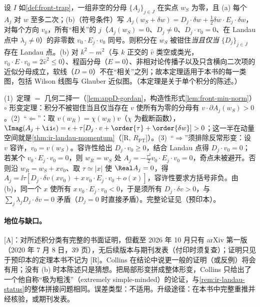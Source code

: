\begin{theorem}\label{thm:front-collins-pinch}
设 $I$ 如\cref{def:front-trap}，一组非空的分母 $\{A_j\}_{j\in J}$ 在实点 $w_S$ 为零，且 (a) 每个 $A_j$ 对 $w$ 至多二次；(b)（符号条件）写 $A_j(w_S+\delta w)=D_j\cdot\delta w+\frac12\delta w\cdot E_j\cdot\delta w$，对每个方向 $v_0$，所有“相关”的 $j$（$A_j(w_S)=0$、$D_j\ne0$、$D_j\cdot v_0=0$、在 Landau 点中 $\lambda_j\ne0$）的非零数 $v_0\cdot E_j\cdot v_0$ 同号。则积分在 $w_S$ 被钳住\emph{当且仅当} $\{D_j\}_{j\in J}$ 存在 Landau 点。(b) 对 $k^2-m^2$（与 $k$ 正交的 $\hat v$ 类空或类光，$v_0\cdot E\cdot v_0=2\hat v^2\le0$）、程函分母（$E=0$）、非相对论传播子以及只含横向二次项的近似分母成立，软线（$D=0$）不在“相关”之列；故本定理适用于本书的每一类图，包括 Wilson 线图与 Glauber 近似图。（本定理是关于单个积分的陈述。）
\end{theorem}

\begin{proofsketch}
(1)~定理 $=$ 几何二择一（\cref{lem:appD-gordan}，构造性形式\cref{lem:front-min-norm}）$\circ$ 形变定理：积分不被钳住当且仅当存在 $v$ 使所有为零的分母有 $v\cdot\partial A_j(w_S)>0$\cite[定理~2]{Collins:2020euz}。(2)~“$\Leftarrow$”：取 $v(w_R)=\chi(w_R)v$（$\chi$ 为截断函数），$\Imag(A_j+\ii\epsilon)=\epsilon+\tau[D_j\cdot v+\order{\tau}+\order{\delta w}]>0$\cite[式~(8.1)]{Collins:2020euz}；这一半在动量空间就是\cref{thm:ir-landau-momentum}（[R, $R_{\mathrm{PT}}$]）。(3)~“$\Rightarrow$”须排除反常形变：设 $v$ 容许，$v_0=v(w_S)$。容许性给出 $D_j\cdot v_0\ge0$，结合 Landau 点得 $D_j\cdot v_0=0$；若某个 $v_0\cdot E_j\cdot v_0=0$，则 $w_R=w_S$ 处 $A_j=-\frac{\tau^2}2v_0\cdot E_j\cdot v_0=0$，奇点未被避开。否则沿 $w_R=w_S+xv_0$、取 $\tau\simeq|x|$ 使 $\Real A_j=0$，得 $A_j=\ii\tau[D_j\cdot\delta v(xv_0)+x\,v_0\cdot E_j\cdot v_0+o(x)]$\cite[式~(8.13)--(8.14)]{Collins:2020euz}，容许性要求方括号非负。由 (b)，同一个 $x$ 使所有 $x\,v_0\cdot E_j\cdot v_0<0$，于是须所有 $D_j\cdot\delta v>0$，与 $\sum_j\lambda_jD_j\cdot\delta v=0$ 矛盾（$D_j=0$ 时直接矛盾）。完整论证见\cite[第~V--VIII~节]{Collins:2020euz}（预印本）。
\end{proofsketch}

\paragraph{地位与缺口。}[A]：对所述积分类有完整的书面证明，但截至 2026 年 10 月\cite{Collins:2020euz}只有 arXiv 第一版（2020 年 7 月 8 日，39 页），无后续版本与期刊发表（付印时须复查）；证明只见于预印本的定理本书不记为 [R]。Collins 在结论中说更一般的证明（或反例）将会有用；没有 (b) 时本陈述只是猜想。把局部形变拼成整体形变，Collins 只给出了一个他自称“极为粗浅”（extremely simple-minded）的论证\cite[第~VIII.D~节]{Collins:2020euz}，与\cref{rem:ir-landau-status}的整体拼接问题相同。误差类型：不适用。升级途径：在本书中完整重推并经核验，或期刊发表。

